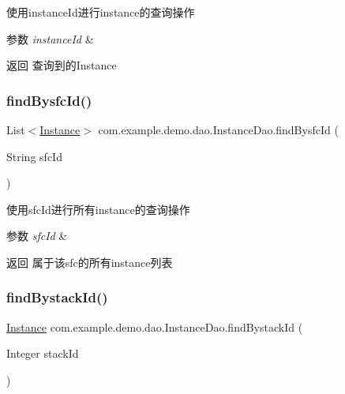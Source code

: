 使用instance\+Id进行instance的查询操作 
\begin{DoxyParams}{参数}
{\em instance\+Id} & \\
\hline
\end{DoxyParams}
\begin{DoxyReturn}{返回}
查询到的\+Instance 
\end{DoxyReturn}
\mbox{\label{interfacecom_1_1example_1_1demo_1_1dao_1_1_instance_dao_a053211768d8b136e67793dcb8768efe3}} 
\subsubsection{\texorpdfstring{find\+Bysfc\+Id()}{findBysfcId()}}
{\footnotesize\ttfamily List$<$\mbox{\hyperlink{classcom_1_1example_1_1demo_1_1modular_1_1_instance}{Instance}}$>$ com.\+example.\+demo.\+dao.\+Instance\+Dao.\+find\+Bysfc\+Id (\begin{DoxyParamCaption}\item[{String}]{sfc\+Id }\end{DoxyParamCaption})}

使用sfc\+Id进行所有instance的查询操作 
\begin{DoxyParams}{参数}
{\em sfc\+Id} & \\
\hline
\end{DoxyParams}
\begin{DoxyReturn}{返回}
属于该sfc的所有instance列表 
\end{DoxyReturn}
\mbox{\label{interfacecom_1_1example_1_1demo_1_1dao_1_1_instance_dao_a484d2d6e066536dc4964cd0d5cbe692c}} 
\subsubsection{\texorpdfstring{find\+Bystack\+Id()}{findBystackId()}}
{\footnotesize\ttfamily \mbox{\hyperlink{classcom_1_1example_1_1demo_1_1modular_1_1_instance}{Instance}} com.\+example.\+demo.\+dao.\+Instance\+Dao.\+find\+Bystack\+Id (\begin{DoxyParamCaption}\item[{Integer}]{stack\+Id }\end{DoxyParamCaption})}

